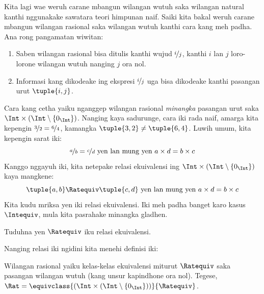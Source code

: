 \documentclass[../../../include/open-logic-section]{subfiles}
\begin{document}

Kita lagi wae weruh carane mbangun wilangan wutuh saka wilangan
natural kanthi nggunakake sawatara teori himpunan naif. Saiki kita
bakal weruh carane mbangun wilangan rasional saka wilangan wutuh
kanthi cara kang meh padha. Ana rong pangamatan wiwitan:
\begin{enumerate}
	\item Saben wilangan rasional bisa ditulis kanthi wujud $\nicefrac{i}{j}$,
	kanthi $i$ lan $j$ loro-lorone wilangan wutuh nanging $j$ ora nol.
	\item Informasi kang dikodeake ing ekspresi $\nicefrac{i}{j}$
	uga bisa dikodeake kanthi pasangan urut $\tuple{ i, j}$.
\end{enumerate}
Cara kang cetha yaiku nganggep wilangan rasional \emph{minangka}
pasangan urut saka $\Int \times (\Int \setminus \{0_\Int\})$.
Nanging kaya sadurunge, cara iki rada naif, amarga kita kepengin
$\nicefrac{3}{2} = \nicefrac{6}{4}$, kamangka $\tuple{ 3, 2}\neq \tuple{ 6,
4}$. Luwih umum, kita kepengin sarat iki:
\[
	\nicefrac{a}{b} = \nicefrac{c}{d} \text{ yen lan mung yen } a \times d = b \times c
\]
Kanggo nggayuh iki, kita netepake {relasi ekuivalensi} ing $\Int \times
(\Int \setminus \{0_\Int\})$ kaya mangkene:
\[
	\tuple{ a, b }\Ratequiv \tuple{ c, d} \text{ yen lan mung yen }a \times d = b \times c
\]
Kita kudu mriksa yen iki relasi ekuivalensi. Iki meh padha banget karo
kasus $\Intequiv$, mula kita pasrahake minangka gladhen.
\begin{prob}
Tuduhna yen $\Ratequiv$ iku relasi ekuivalensi.
\end{prob}
Nanging relasi iki ngidini kita menehi definisi iki:
\begin{defn}
Wilangan rasional yaiku kelas-kelas ekuivalensi miturut $\Ratequiv$ saka
pasangan wilangan wutuh (kang unsur kapindhone ora nol). Tegese, $\Rat =
\equivclass{(\Int \times (\Int\setminus \{0_\Int\}))}{\Ratequiv}$.
\end{defn}
\end{document}
